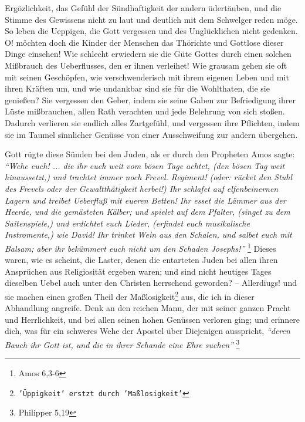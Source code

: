 Ergözlichkeit, das Gefühl der Sündhaftigkeit der andern üdertäuben, und die
Stimme des Gewissens nicht zu laut und deutlich mit dem Schwelger reden möge. So
leben die Ueppigen, die Gott vergessen und des Unglücklichen nicht gedenken. O!
möchten doch die Kinder der Menschen das Thörichte und Gottlose dieser Dinge
einsehen! Wie schlecht erwiedern sie die Güte Gottes durch einen solchen
Mißbrauch des Ueberflusses, den er ihnen verleihet! Wie grausam gehen sie oft
mit seinen Geschöpfen, wie verschwenderisch mit ihrem eigenen Leben und mit
ihren Kräften um, und wie undankbar sind sie für die Wohlthaten, die sie
genießen? Sie vergessen den Geber, indem sie seine Gaben zur Befriedigung ihrer
Lüste mißbrauchen, allen Rath verachten und jede Belehrung von sich stoßen.
Dadurch verlieren sie endlich alles Zartgefühl, und vergessen ihre Pflichten,
indem sie im Taumel sinnlicher Genüsse von einer Ausschweifung zur andern
übergehen.

\medskip

Gott rügte diese Sünden bei den Juden, als er durch den Propheten Amos sagte:
\textit{"`Wehe euch! ... die ihr euch weit vom bösen Tage achtet, (den bösen Tag weit
hinaussetzt,) und trachtet immer noch Frevel. Regiment! (oder: rücket den Stuhl
des Frevels oder der Gewaltthätigkeit herbei!) Ihr schlafet auf elfenbeinernen
 Lagern und treibet Ueberfluß mit eueren Betten! Ihr esset die Lämmer aus der
Heerde, und die gemästeten Kälber; und spielet auf dem Pfalter, (singet zu dem
Saitenspiele,) und erdichtet euch Lieder, (erfindet euch musikalische
Instromente,) wie David! Ihr trinket Wein aus den Schalen, und salbet euch mit
Balsam; aber ihr bekümmert euch nicht um den Schaden Josephs!"'}
\footnote{Amos 6,3-6}
Dieses waren, wie es scheint, die Laster, denen die entarteten
Juden bei allen ihren Ansprüchen aus Religiosität ergeben waren; und sind nicht
heutiges Tages dieselben Uebel auch unter den Christen herrschend geworden? --
Allerdiugs! und sie machen einen großen Theil der Maßlosigkeit\footnote{\texttt{'Üppigkeit' erstzt durch 'Maßlosigkeit'}} aus, die ich in
dieser Abhandlung angreife. Denk an den reichen Mann, der mit seiner ganzen
Pracht und Herrlichkeit, und bei allen seinen hohen Genüssen verloren ging; und
erinnere dich, was für ein schweres Wehe der Apostel über Diejenigen ausspricht,
\textit{"`deren Bauch ihr Gott ist, und die in ihrer Schande eine Ehre suchen"'}
\footnote{Philipper 5,19}

